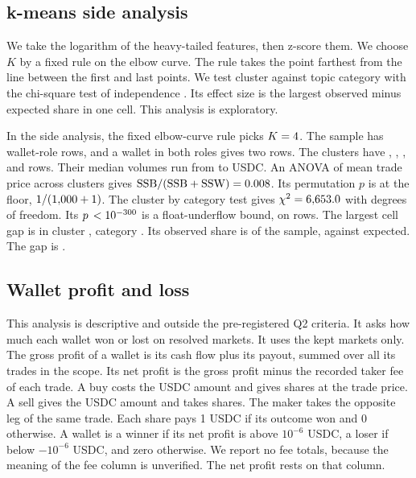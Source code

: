 \subsection{k-means side analysis}\label{sec:app-kmeans}
We take the logarithm of the heavy-tailed features, then z-score them.
We choose $K$ by a fixed rule on the elbow curve.
The rule takes the point farthest from the line between the first and last points.
We test cluster against topic category with the chi-square test of independence .
Its effect size is the largest observed minus expected share in one cell.
This analysis is exploratory.

In the side analysis, the fixed elbow-curve rule picks $K=4$.
The sample has \KmeansNSample{} wallet-role rows, and a wallet in both roles gives two rows.
The \KmeansK{} clusters have \ClusterZeroN, \ClusterOneN, \ClusterTwoN, and \ClusterThreeN{} rows.
Their median volumes run from \ClusterTwoMedianVolume{} to \ClusterOneMedianVolume{} USDC.
An ANOVA of mean trade price across clusters gives $\mathrm{SSB}/(\mathrm{SSB}+\mathrm{SSW})=0.008$.
Its permutation $p$ is at the floor, $1/(1{,}000+1)$.
The cluster by category test gives $\chi^2=6{,}653.0$ with \KmeansCategoryDf{} degrees of freedom.
Its $p\,<10^{-300}$ is a float-underflow bound, on \KmeansNSample{} rows.
The largest cell gap is in cluster \ClusterCategoryGapCluster, category \ClusterCategoryGapCategory.
Its observed share is \ClusterCategoryGapObs{} of the sample, against \ClusterCategoryGapExp{} expected.
The gap is \ClusterCategoryGapDiff.

\subsection{Wallet profit and loss}\label{sec:app-q2-pnl}
This analysis is descriptive and outside the pre-registered Q2 criteria.
It asks how much each wallet won or lost on resolved markets.
It uses the kept markets only.
The gross profit of a wallet is its cash flow plus its payout, summed over all its trades in the scope.
Its net profit is the gross profit minus the recorded taker fee of each trade.
A buy costs the USDC amount and gives shares at the trade price.
A sell gives the USDC amount and takes shares.
The maker takes the opposite leg of the same trade.
Each share pays 1 USDC if its outcome won and 0 otherwise.
A wallet is a winner if its net profit is above $10^{-6}$ USDC, a loser if below $-10^{-6}$ USDC, and zero otherwise.
We report no fee totals, because the meaning of the fee column is unverified.
The net profit rests on that column.

